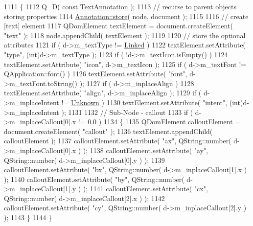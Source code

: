 \begin{DoxyCode}
1111 \{
1112     Q\_D( \textcolor{keyword}{const} \hyperlink{classOkular_1_1TextAnnotation}{TextAnnotation} );
1113     \textcolor{comment}{// recurse to parent objects storing properties}
1114     \hyperlink{classOkular_1_1Annotation_abbb607cf5929ffd06f789a22b353dcb3}{Annotation::store}( node, document );
1115 
1116     \textcolor{comment}{// create [text] element}
1117     QDomElement textElement = document.createElement( \textcolor{stringliteral}{"text"} );
1118     node.appendChild( textElement );
1119 
1120     \textcolor{comment}{// store the optional attributes}
1121     \textcolor{keywordflow}{if} ( d->m\_textType != \hyperlink{classOkular_1_1TextAnnotation_af560204454bf812797bc95bea730b06eaf7d7133e8e4850bf030e108537a9887b}{Linked} )
1122         textElement.setAttribute( \textcolor{stringliteral}{"type"}, (\textcolor{keywordtype}{int})d->m\_textType );
1123     \textcolor{keywordflow}{if} ( !d->m\_textIcon.isEmpty() )
1124         textElement.setAttribute( \textcolor{stringliteral}{"icon"}, d->m\_textIcon );
1125     \textcolor{keywordflow}{if} ( d->m\_textFont != QApplication::font() )
1126         textElement.setAttribute( \textcolor{stringliteral}{"font"}, d->m\_textFont.toString() );
1127     \textcolor{keywordflow}{if} ( d->m\_inplaceAlign )
1128         textElement.setAttribute( \textcolor{stringliteral}{"align"}, d->m\_inplaceAlign );
1129     \textcolor{keywordflow}{if} ( d->m\_inplaceIntent != \hyperlink{classOkular_1_1TextAnnotation_a6494ecc81861c6b3da81aa98a3cd16c5a6562381985b3edbd68dab5602bed50f6}{Unknown} )
1130         textElement.setAttribute( \textcolor{stringliteral}{"intent"}, (\textcolor{keywordtype}{int})d->m\_inplaceIntent );
1131 
1132     \textcolor{comment}{// Sub-Node - callout}
1133     \textcolor{keywordflow}{if} ( d->m\_inplaceCallout[0].x != 0.0 )
1134     \{
1135         QDomElement calloutElement = document.createElement( \textcolor{stringliteral}{"callout"} );
1136         textElement.appendChild( calloutElement );
1137         calloutElement.setAttribute( \textcolor{stringliteral}{"ax"}, QString::number( d->m\_inplaceCallout[0].x ) );
1138         calloutElement.setAttribute( \textcolor{stringliteral}{"ay"}, QString::number( d->m\_inplaceCallout[0].y ) );
1139         calloutElement.setAttribute( \textcolor{stringliteral}{"bx"}, QString::number( d->m\_inplaceCallout[1].x ) );
1140         calloutElement.setAttribute( \textcolor{stringliteral}{"by"}, QString::number( d->m\_inplaceCallout[1].y ) );
1141         calloutElement.setAttribute( \textcolor{stringliteral}{"cx"}, QString::number( d->m\_inplaceCallout[2].x ) );
1142         calloutElement.setAttribute( \textcolor{stringliteral}{"cy"}, QString::number( d->m\_inplaceCallout[2].y ) );
1143     \}
1144 \}
\end{DoxyCode}
